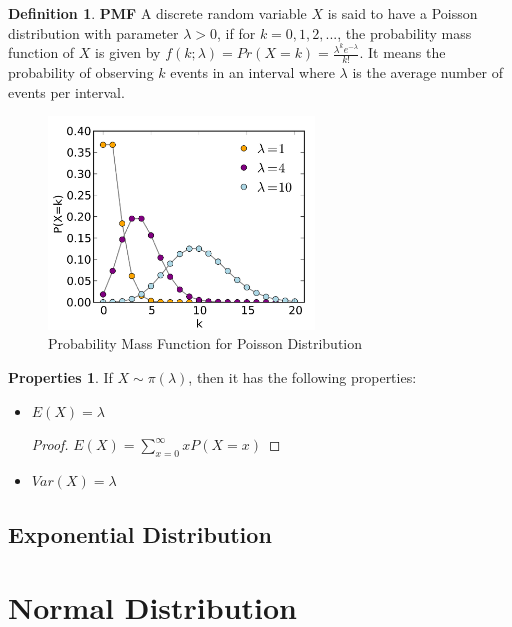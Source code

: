 \documentclass{article}
\theoremstyle{definition}
\newtheorem{defi}{Definition}[section]
\newtheorem{prop}{Properties}[section]
\begin{document}
\begin{defi}
\textbf{PMF} A discrete random variable $X$ is said to have a Poisson distribution with parameter $\lambda>0$, if for $k=0,1,2,...$, the probability mass function of $X$ is given by $f(k;\lambda)=Pr(X=k)=\frac{\lambda^ke^{-\lambda}}{k!}$. It means the probability of observing $k$ events in an interval where $\lambda$ is the average number of events per interval.
\begin{figure}[h]
\caption{Probability Mass Function for Poisson Distribution}
\centering
\includegraphics[width=200pt]{Statistics/images/Poisson_pmf.pdf}
\end{figure}
\end{defi}

\begin{prop}
If $X\sim \pi(\lambda)$, then it has the following properties:
\begin{itemize}
    \item $E(X)=\lambda$
    \begin{proof}
    $E(X)=\sum_{x=0}^{\infty}xP(X=x)$
    \end{proof}
    \item $Var(X)=\lambda$
\end{itemize}
\end{prop}

\subsection{Exponential Distribution}
\section{Normal Distribution}
\end{document}
